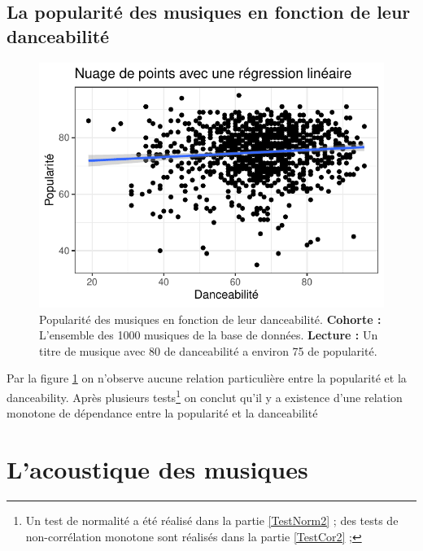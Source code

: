 \documentclass[french,]{compterendu}
\let\rmarkdownfootnote\footnote%
\def\footnote{\protect\rmarkdownfootnote}
\theoremstyle{urcastyle}
\theoremstyle{remark}
\begin{document}
\hypertarget{la-popularituxe9-des-musiques-en-fonction-de-leur-danceabilituxe9}{%
\subsection{La popularité des musiques en fonction de leur danceabilité}\label{la-popularituxe9-des-musiques-en-fonction-de-leur-danceabilituxe9}}





\begin{figure}[ht!]

{\centering \includegraphics{ERTAS_ELIF-CR_SEP0831_files/figure-latex/popdnce-1} 

}

\caption{Popularité des musiques en fonction de leur danceabilité.
\textbf{Cohorte :} L'ensemble des 1000 musiques de la base de données.
\textbf{Lecture :} Un titre de musique avec 80 de danceabilité a environ 75 de popularité.}\label{fig:popdnce}
\end{figure}

Par la figure \ref{fig:popdnce} on n'observe aucune relation particulière entre la popularité et la danceability.
Après plusieurs tests\footnote{Un test de normalité a été réalisé dans la partie \ref{TestNorm2} ; des tests de non-corrélation monotone sont réalisés dans la partie \ref{TestCor2} ;} on conclut qu'il y a existence d'une relation monotone de dépendance entre la popularité et la danceabilité

\hypertarget{lacoustique-des-musiques}{%
\section{L'acoustique des musiques}\label{lacoustique-des-musiques}}
\end{document}
